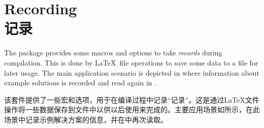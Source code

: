
\setcounter{section}{7}
\setcounter{subsection}{0}
\setcounter{subsubsection}{0}
\section{Recording\\记录}\label{sec:recording}%
%
The package provides some macros and options to take \emph{records} during compilation. 
This is done by \LaTeX\ file operations to save some data to a file for later usage. 
The main application scenario is depicted in  where information about example solutions is recorded and read again in .

该套件提供了一些宏和选项，用于在编译过程中记录“记录”。这是通过\LaTeX 文件操作将一些数据保存到文件中以供以后使用来完成的。主要应用场景如所示，在此场景中记录示例解决方案的信息，并在中再次读取。

